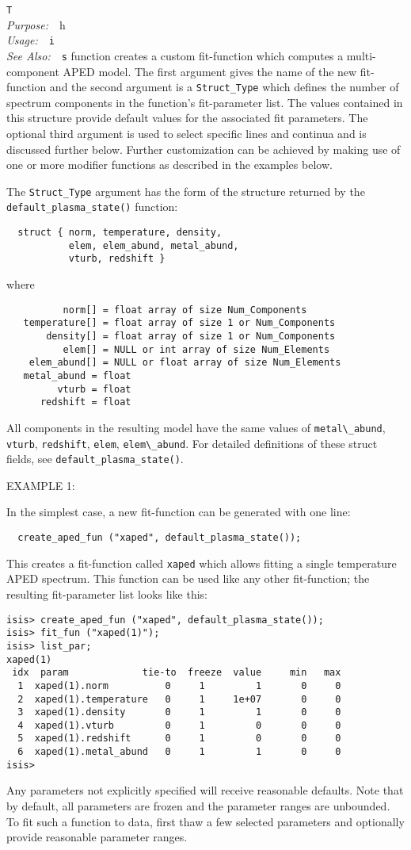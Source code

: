 \documentclass{book}
\makeatletter
\newif\ifpdf
\newenvironment{isisfunction}[4]%
{\index{{#1}@{\tt #1}}%
  \ifpdf
  \else
     \addcontentsline{toc}{subsection}{{#1} -- {#2}}
  \fi
  \vbox{
          \vspace*{\baselineskip}
          {\LARGE\tt #1}\vspace*{\baselineskip}\\
          {{\it Purpose:}~~{#2}}\\
          {{\it Usage:}~~{\tt #3}}\\
          {{\it See Also:}~~{\tt #4}}
       }
}%
{ }
\makeatother
\begin{document}
{\begin{isisfunction}
This function creates a custom fit-function which computes a multi-component
APED model. The first argument gives the name of the new fit-function and the
second argument is a \verb|Struct_Type| which defines the number of spectrum
components in the function's fit-parameter list. The values contained in this
structure provide default values for the associated fit parameters. The
optional third argument is used to select specific lines and continua and is
discussed further below.  Further customization can be achieved by
making use of one or more modifier functions as described in the examples
below.

The \verb|Struct_Type| argument has the form of the structure
returned by the \verb|default_plasma_state()| function:
\begin{verbatim}
  struct { norm, temperature, density,
           elem, elem_abund, metal_abund,
           vturb, redshift }
\end{verbatim}
where
\begin{verbatim}
          norm[] = float array of size Num_Components
   temperature[] = float array of size 1 or Num_Components
       density[] = float array of size 1 or Num_Components
          elem[] = NULL or int array of size Num_Elements
    elem_abund[] = NULL or float array of size Num_Elements
   metal_abund = float
         vturb = float
      redshift = float
\end{verbatim}
All components in the resulting model have the same values of
\verb|metal\_abund|, \verb|vturb|, \verb|redshift|, \verb|elem|,
\verb|elem\_abund|.  For detailed definitions of these struct
fields, see \verb|default_plasma_state()|.

EXAMPLE 1:

In the simplest case, a new fit-function can
be generated with one line:
\begin{verbatim}
  create_aped_fun ("xaped", default_plasma_state());
\end{verbatim}
This creates a fit-function called \verb|xaped| which allows
fitting a single temperature APED spectrum.  This function can be
used like any other fit-function; the resulting fit-parameter list
looks like this:
\begin{verbatim}
isis> create_aped_fun ("xaped", default_plasma_state());
isis> fit_fun ("xaped(1)");
isis> list_par;
xaped(1)
 idx  param             tie-to  freeze  value     min   max
  1  xaped(1).norm          0     1         1       0     0
  2  xaped(1).temperature   0     1     1e+07       0     0
  3  xaped(1).density       0     1         1       0     0
  4  xaped(1).vturb         0     1         0       0     0
  5  xaped(1).redshift      0     1         0       0     0
  6  xaped(1).metal_abund   0     1         1       0     0
isis>
\end{verbatim}
Any parameters not explicitly specified will receive reasonable
defaults. Note that by default, all parameters are frozen and the
parameter ranges are unbounded.  To fit such a function
to data, first thaw a few selected parameters and optionally
provide reasonable parameter ranges.


\end{isisfunction}}
\end{document}
